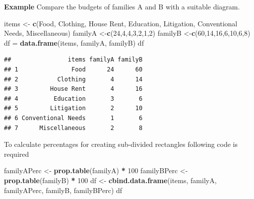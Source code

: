 \documentclass[]{article}
\newenvironment{Shaded}{\begin{snugshade}}{\end{snugshade}}
\newcommand{\DecValTok}[1]{\textcolor[rgb]{0.00,0.00,0.81}{#1}}
\newcommand{\KeywordTok}[1]{\textcolor[rgb]{0.13,0.29,0.53}{\textbf{#1}}}
\newcommand{\NormalTok}[1]{#1}
\newcommand{\OperatorTok}[1]{\textcolor[rgb]{0.81,0.36,0.00}{\textbf{#1}}}
\newcommand{\StringTok}[1]{\textcolor[rgb]{0.31,0.60,0.02}{#1}}
\begin{document}
\textbf{Example} Compare the budgets of families A and B with a suitable
diagram.

\begin{Shaded}
\begin{Highlighting}[]
\NormalTok{items \textless{}{-}}\StringTok{ }\KeywordTok{c}\NormalTok{(}\StringTok{\textquotesingle{}Food\textquotesingle{}}\NormalTok{, }\StringTok{\textquotesingle{}Clothing\textquotesingle{}}\NormalTok{, }\StringTok{\textquotesingle{}House Rent\textquotesingle{}}\NormalTok{, }\StringTok{\textquotesingle{}Education\textquotesingle{}}\NormalTok{, }\StringTok{\textquotesingle{}Litigation\textquotesingle{}}\NormalTok{, }\StringTok{\textquotesingle{}Conventional Needs\textquotesingle{}}\NormalTok{, }\StringTok{\textquotesingle{}Miscellaneous\textquotesingle{}}\NormalTok{)}
\NormalTok{familyA \textless{}{-}}\KeywordTok{c}\NormalTok{(}\DecValTok{24}\NormalTok{,}\DecValTok{4}\NormalTok{,}\DecValTok{4}\NormalTok{,}\DecValTok{3}\NormalTok{,}\DecValTok{2}\NormalTok{,}\DecValTok{1}\NormalTok{,}\DecValTok{2}\NormalTok{)}
\NormalTok{familyB \textless{}{-}}\KeywordTok{c}\NormalTok{(}\DecValTok{60}\NormalTok{,}\DecValTok{14}\NormalTok{,}\DecValTok{16}\NormalTok{,}\DecValTok{6}\NormalTok{,}\DecValTok{10}\NormalTok{,}\DecValTok{6}\NormalTok{,}\DecValTok{8}\NormalTok{)}
\NormalTok{df =}\StringTok{ }\KeywordTok{data.frame}\NormalTok{(items, familyA, familyB)}
\NormalTok{df}
\end{Highlighting}
\end{Shaded}

\begin{verbatim}
##                items familyA familyB
## 1               Food      24      60
## 2           Clothing       4      14
## 3         House Rent       4      16
## 4          Education       3       6
## 5         Litigation       2      10
## 6 Conventional Needs       1       6
## 7      Miscellaneous       2       8
\end{verbatim}

To calculate percentages for creating sub-divided rectangles following
code is required

\begin{Shaded}
\begin{Highlighting}[]
\NormalTok{familyAPerc \textless{}{-}}\StringTok{ }\KeywordTok{prop.table}\NormalTok{(familyA) }\OperatorTok{*}\StringTok{ }\DecValTok{100}
\NormalTok{familyBPerc \textless{}{-}}\StringTok{ }\KeywordTok{prop.table}\NormalTok{(familyB) }\OperatorTok{*}\StringTok{ }\DecValTok{100}
\NormalTok{df \textless{}{-}}\StringTok{ }\KeywordTok{cbind.data.frame}\NormalTok{(items, familyA, familyAPerc, familyB, familyBPerc)}
\NormalTok{df}
\end{Highlighting}
\end{Shaded}
\end{document}
